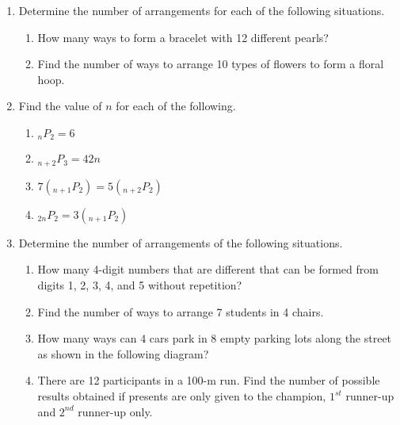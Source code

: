 \documentclass{report}
\newcommand\permtwo[2][^n]{{}_{#1}P_{#2}}
\begin{document}
\begin{multicols*}{2}
\begin{enumerate}
            \item Determine the number of arrangements for each of the following situations.
                  \begin{enumerate}
                        \item How many ways to form a bracelet with 12 different pearls?
                        \item Find the number of ways to arrange 10 types of flowers to form a floral hoop.
                  \end{enumerate}

            \item Find the value of $n$ for each of the following.
                  \begin{enumerate}
                        \item $\permtwo[n]{2} = 6$
                        \item $\permtwo[n+2]{3} = 42n$
                        \item $7(\permtwo[n+1]{2}) = 5(\permtwo[n+2]{2})$
                        \item $\permtwo[2n]{2} = 3(\permtwo[n+1]{2})$
                  \end{enumerate}

            \item Determine the number of arrangements of the following situations.
                  \begin{enumerate}
                        \item How many 4-digit numbers that are different that can be formed from digits 1,
                              2, 3, 4, and 5 without repetition?
                        \item Find the number of ways to arrange 7 students in 4 chairs.
                        \item How many ways can 4 cars park in 8 empty parking lots along the street as shown
                              in the following diagram?
                        \item There are 12 participants in a 100-m run. Find the number of possible results
                              obtained if presents are only given to the champion, $1^{st}$ runner-up and
                              $2^{nd}$ runner-up only.
                  \end{enumerate}


\end{enumerate}
\end{multicols*}
\end{document}
